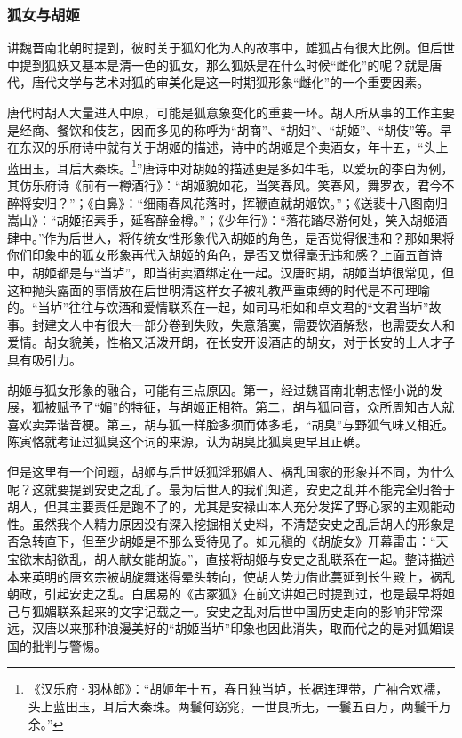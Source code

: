\documentclass[UTF8, 12pt, A4paper]{article}
\begin{document}
\subsubsection{狐女与胡姬}

讲魏晋南北朝时提到，彼时关于狐幻化为人的故事中，雄狐占有很大比例。但后世中提到狐妖又基本是清一色的狐女，那么狐妖是在什么时候“雌化”的呢？就是唐代，唐代文学与艺术对狐的审美化是这一时期狐形象“雌化”的一个重要因素。

唐代时胡人大量进入中原，可能是狐意象变化的重要一环。胡人所从事的工作主要是经商、餐饮和伎艺，因而多见的称呼为“胡商”、“胡妇”、“胡姬”、“胡伎”等。早在东汉的乐府诗中就有关于胡姬的描述，诗中的胡姬是个卖酒女，年十五，“头上蓝田玉，耳后大秦珠。\footnote{《汉乐府·羽林郎》：“胡姬年十五，春日独当垆，长裾连理带，广袖合欢襦，头上蓝田玉，耳后大秦珠。两鬟何窈窕，一世良所无，一鬟五百万，两鬟千万余。”}”唐诗中对胡姬的描述更是多如牛毛，以爱玩的李白为例，其仿乐府诗《前有一樽酒行》：“胡姬貌如花，当笑春风。笑春风，舞罗衣，君今不醉将安归？”；《白鼻》：“细雨春风花落时，挥鞭直就胡姬饮。”；《送裴十八图南归嵩山》：“胡姬招素手，延客醉金樽。”；《少年行》：“落花踏尽游何处，笑入胡姬酒肆中。”作为后世人，将传统女性形象代入胡姬的角色，是否觉得很违和？那如果将你们印象中的狐女形象再代入胡姬的角色，是否又觉得毫无违和感？上面五首诗中，胡姬都是与“当垆”，即当街卖酒绑定在一起。汉唐时期，胡姬当垆很常见，但这种抛头露面的事情放在后世明清这样女子被礼教严重束缚的时代是不可理喻的。“当垆”往往与饮酒和爱情联系在一起，如司马相如和卓文君的“文君当垆”故事。封建文人中有很大一部分卷到失败，失意落寞，需要饮酒解愁，也需要女人和爱情。胡女貌美，性格又活泼开朗，在长安开设酒店的胡女，对于长安的士人才子具有吸引力。

胡姬与狐女形象的融合，可能有三点原因。第一，经过魏晋南北朝志怪小说的发展，狐被赋予了“媚”的特征，与胡姬正相符。第二，胡与狐同音，众所周知古人就喜欢卖弄谐音梗。第三，胡与狐一样脸多须而体多毛，“胡臭”与野狐气味又相近。陈寅恪就考证过狐臭这个词的来源，认为胡臭比狐臭更早且正确。

但是这里有一个问题，胡姬与后世妖狐淫邪媚人、祸乱国家的形象并不同，为什么呢？这就要提到安史之乱了。最为后世人的我们知道，安史之乱并不能完全归咎于胡人，但其主要责任是跑不了的，尤其是安禄山本人充分发挥了野心家的主观能动性。虽然我个人精力原因没有深入挖掘相关史料，不清楚安史之乱后胡人的形象是否急转直下，但至少胡姬是不那么受待见了。如元稹的《胡旋女》开幕雷击：“天宝欲末胡欲乱，胡人献女能胡旋。”，直接将胡姬与安史之乱联系在一起。整诗描述本来英明的唐玄宗被胡旋舞迷得晕头转向，使胡人势力借此蔓延到长生殿上，祸乱朝政，引起安史之乱。白居易的《古冢狐》在前文讲妲己时提到过，也是最早将妲己与狐媚联系起来的文字记载之一。安史之乱对后世中国历史走向的影响非常深远，汉唐以来那种浪漫美好的“胡姬当垆”印象也因此消失，取而代之的是对狐媚误国的批判与警惕。
\end{document}
